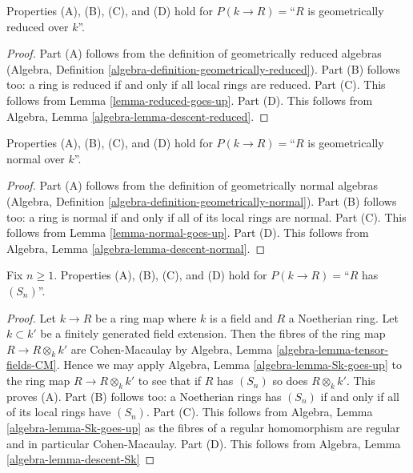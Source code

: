 \begin{lemma}
\label{lemma-formal-fibres-reduced}
Properties (A), (B), (C), and (D) hold for
$P(k \to R) =$``$R$ is geometrically reduced over $k$''.
\end{lemma}

\begin{proof}
Part (A) follows from the definition of geometrically reduced
algebras (Algebra, Definition \ref{algebra-definition-geometrically-reduced}).
Part (B) follows too: a ring is reduced if and only if
all local rings are reduced.
Part (C). This follows from Lemma \ref{lemma-reduced-goes-up}.
Part (D). This follows from Algebra, Lemma \ref{algebra-lemma-descent-reduced}.
\end{proof}

\begin{lemma}
\label{lemma-formal-fibres-normal}
Properties (A), (B), (C), and (D) hold for
$P(k \to R) =$``$R$ is geometrically normal over $k$''.
\end{lemma}

\begin{proof}
Part (A) follows from the definition of geometrically normal
algebras (Algebra, Definition \ref{algebra-definition-geometrically-normal}).
Part (B) follows too: a ring is normal if and only if all of its
local rings are normal.
Part (C). This follows from Lemma \ref{lemma-normal-goes-up}.
Part (D). This follows from Algebra, Lemma \ref{algebra-lemma-descent-normal}.
\end{proof}

\begin{lemma}
\label{lemma-formal-fibres-Sk}
Fix $n \geq 1$. Properties (A), (B), (C), and (D) hold for
$P(k \to R) =$``$R$ has $(S_n)$''.
\end{lemma}

\begin{proof}
Let $k \to R$ be a ring map where $k$ is a field and $R$ a Noetherian
ring. Let $k \subset k'$ be a finitely generated field extension.
Then the fibres of the ring map $R \to R \otimes_k k'$ are
Cohen-Macaulay by Algebra, Lemma \ref{algebra-lemma-tensor-fields-CM}.
Hence we may apply Algebra, Lemma \ref{algebra-lemma-Sk-goes-up}
to the ring map $R \to R \otimes_k k'$ to see that if $R$ has $(S_n)$
so does $R \otimes_k k'$. This proves (A).
Part (B) follows too: a Noetherian rings has $(S_n)$ if and only if
all of its local rings have $(S_n)$.
Part (C). This follows from
Algebra, Lemma \ref{algebra-lemma-Sk-goes-up}
as the fibres of a regular homomorphism are regular and in particular
Cohen-Macaulay.
Part (D). This follows from
Algebra, Lemma \ref{algebra-lemma-descent-Sk}
\end{proof}

